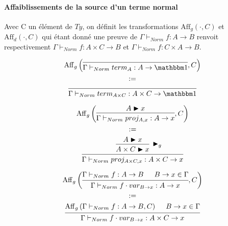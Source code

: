 \documentclass[conference]{IEEEtran}
\begin{document}
\paragraph{Affaiblissements de la source d'un terme normal} Avec C un élément de $Ty$, on définit les transformations $\mathrm{Aff}_g(\cdot, C)$ et $\mathrm{Aff}_d(\cdot, C)$ qui étant donné une preuve de $\Gamma \vdash_{Norm} f : A \rightarrow B$ renvoit respectivement $\Gamma \vdash_{Norm} f : A \times C \rightarrow B$ et $\Gamma \vdash_{Norm} f : C \times A \rightarrow B$.

\begin{align}
\begin{gathered}
	\mathrm{Aff}_g \left(
	\begin{prooftree}
		\infer0[]{\Gamma \vdash_{Norm} term_A : A \rightarrow \mathbbm 1}
	\end{prooftree}
	, C
	\right) \\
	:= \\
	\begin{prooftree}
		\infer0[]{\Gamma \vdash_{Norm} term_{A \times C} : A \times C \rightarrow \mathbbm 1}
	\end{prooftree}
\end{gathered}
\end{align}

\begin{align}
\begin{gathered}
	\mathrm{Aff}_g \left(
	\begin{prooftree}
		\hypo[]{A \blacktriangleright x}
		\infer1[]{\Gamma \vdash_{Norm} proj_{A,x} : A \rightarrow x}
	\end{prooftree} 
	, C
	\right) \\
	:= \\
	\begin{prooftree}
		\hypo[]{A \blacktriangleright x}
		\infer1[$\blacktriangleright_g$]{A \times C \blacktriangleright x}
		\infer1[]{\Gamma \vdash_{Norm} proj_{A \times C,x} : A \times C \rightarrow x}
	\end{prooftree}
\end{gathered}
\end{align}

\begin{align}
\begin{gathered}
	\mathrm{Aff}_g \left(
	\begin{prooftree}
		\hypo[]{\Gamma \vdash_{Norm} f : A \rightarrow B}
		\hypo[]{B \rightarrow x \in \Gamma}
		\infer2[]{\Gamma \vdash_{Norm} f \cdot var_{B \rightarrow x} : A \rightarrow x}
	\end{prooftree}
	, C
	\right) \\
	:= \\
	\begin{prooftree}
		\hypo[]{\mathrm{Aff}_g \left(\Gamma \vdash_{Norm} f : A \rightarrow B , C\right)}
		\hypo[]{B \rightarrow x \in \Gamma}
		\infer2[]{\Gamma \vdash_{Norm} f \cdot var_{B \rightarrow x} : A \times C \rightarrow x}
	\end{prooftree}
\end{gathered}
\end{align}
\end{document}
